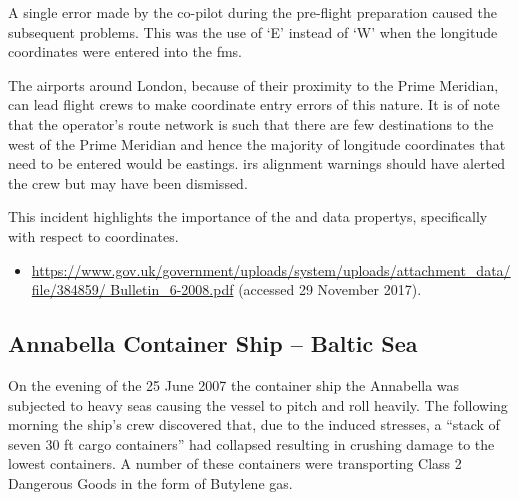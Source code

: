 A single error made by the co-pilot during the pre-flight preparation caused the subsequent problems. This was the use of `E' instead of `W' when the longitude coordinates were entered into the \gls{fms}.

The airports around London, because of their proximity to the Prime Meridian, can lead flight crews to make coordinate entry errors of this nature. It is of note that the operator's route network is such that there are few destinations to the west of the Prime Meridian and hence the majority of longitude coordinates that need to be entered would be eastings. \gls{irs} alignment warnings should have alerted the crew but may have been dismissed.

This incident highlights the importance of the  and  \glspl{data property}, specifically with respect to coordinates.

\begin{samepage}
\begin{itemize}
  \item \raggedright{\href{https://www.gov.uk/government/uploads/system/uploads/attachment_data/file/384859/Bulletin_6-2008.pdf}{https://www.gov.uk/government/uploads/system/uploads/attachment\_data/file/384859/ Bulletin\_6-2008.pdf} (accessed 29 November 2017).}
\end{itemize}
\end{samepage}

\subsection{Annabella Container Ship -- Baltic Sea} \label{bkm:incacc:annabella}
On the evening of the 25 June 2007 the container ship the Annabella was subjected to heavy seas causing the vessel to pitch and roll heavily. The following morning the ship’s crew discovered that, due to the induced stresses, a ``stack of seven 30 ft cargo containers'' had collapsed resulting in crushing damage to the lowest containers. A number of these containers were transporting Class 2 Dangerous Goods in the form of Butylene gas.
 
